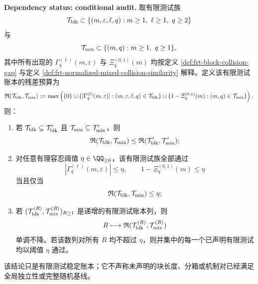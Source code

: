 \begin{proposition}[表观随机审计的有限测试稳定账本]\label{prop:distill-euclid-elements-frt-finite-test-stability-ledger}
\textbf{Dependency status: conditional audit.}
取有限测试族
\[
\mathcal T_{\rm blk}\subset
\{(m,\varepsilon,\ell,q):m\ge1,\ \ell\ge1,\ q\ge2\}
\]
与
\[
\mathcal T_{\rm mix}\subset
\{(m,q):m\ge1,\ q\ge1\},
\]
其中所有出现的 \(\Gamma_q^{(\ell)}(m,\varepsilon)\) 与 \(\Xi_q^{(0,1)}(m)\) 均按定义 \ref{def:frt-block-collision-gap} 与定义 \ref{def:frt-normalized-mixed-collision-similarity} 解释。定义该有限测试账本的残差预算为
\[
\mathfrak R(\mathcal T_{\rm blk},\mathcal T_{\rm mix})
:=\max\left(
\{0\}\cup
\{|\Gamma_q^{(\ell)}(m,\varepsilon)|:(m,\varepsilon,\ell,q)\in\mathcal T_{\rm blk}\}
\cup
\{1-\Xi_q^{(0,1)}(m):(m,q)\in\mathcal T_{\rm mix}\}
\right).
\]
则：
\begin{enumerate}
  \item 若 \(\mathcal T_{\rm blk}\subseteq\mathcal T'_{\rm blk}\) 且 \(\mathcal T_{\rm mix}\subseteq\mathcal T'_{\rm mix}\)，则
  \[
  \mathfrak R(\mathcal T_{\rm blk},\mathcal T_{\rm mix})
  \le
  \mathfrak R(\mathcal T'_{\rm blk},\mathcal T'_{\rm mix});
  \]
  \item 对任意有理容忍阈值 \(\eta\in\QQ_{\ge0}\)，该有限测试族全部通过
  \[
  |\Gamma_q^{(\ell)}(m,\varepsilon)|\le\eta,
  \qquad
  1-\Xi_q^{(0,1)}(m)\le\eta
  \]
  当且仅当
  \[
  \mathfrak R(\mathcal T_{\rm blk},\mathcal T_{\rm mix})\le\eta;
  \]
  \item 若 \((\mathcal T^{(R)}_{\rm blk},\mathcal T^{(R)}_{\rm mix})_{R\ge1}\) 是递增的有限测试账本列，则
  \[
  R\longmapsto
  \mathfrak R(\mathcal T^{(R)}_{\rm blk},\mathcal T^{(R)}_{\rm mix})
  \]
  单调不降。若该数列对所有 \(R\) 均不超过 \(\eta\)，则并集中的每一个已声明有限测试均以阈值 \(\eta\) 通过。
\end{enumerate}
该结论只是有限测试稳定账本；它不声称未声明的块长度、分箱或机制对已经满足全局独立性或完整随机基线。
\end{proposition}

